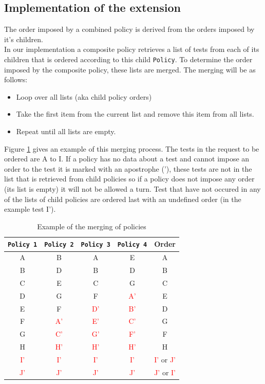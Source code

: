 \documentclass[i3]{oss}
\newcommand{\class}[1]{\texttt{#1}}
\newcommand{\col}[1]{\textcolor{red}{#1}}
\begin{document}
\subsection{Implementation of the extension}
\label{ss:implemenext}

The order imposed by a combined policy is derived from the orders imposed by it's children.\\

In our implementation a composite policy retrieves a list of tests from each of its children that is ordered according to this child \class{Policy}.
To determine the order imposed by the composite policy, these lists are merged.
The merging will be as follows: 
\begin{itemize}
\item Loop over all lists (aka child policy orders)
\item Take the first item from the current list and remove this item from all lists.
\item Repeat until all lists are empty.
\end{itemize}

Figure \ref{fig:orderex} gives an example of this merging process. The tests in the request to be ordered are A to I. If a policy has no data about a test and cannot impose an order to the test it is marked with an apostrophe ('), these tests are not in the list that is retrieved from child policies so if a policy does not impose any order (its list is empty) it will not be allowed a turn.
Test that have not occured in any of the lists of child policies are ordered last with an undefined order (in the example test I').

\begin{table}[h!]
\begin{center}
    \begin{tabular}{ c  c  c  c | c}
     \class{Policy 1} & \class{Policy 2} & \class{Policy 3} & \class{Policy 4} & Order  \\ \hline
     A &        B &        A &        E &        A \\
     B &        D &        B &        D &        B \\
     C &        E &        C &        G &        C\\
     D &        G &        F &   \col{A'} &      E \\
     E &        F &   \col{D'} & \col{B'} &      D \\
     F &   \col{A'} & \col{E'} & \col{C'} &      G \\
     G &   \col{C'} & \col{G'} & \col{F'} &      F \\
     H &   \col{H'} & \col{H'} & \col{H'} &      H \\
\col{I'} & \col{I'} & \col{I'} & \col{I'} & \col{I'} or \col{J'} \\
\col{J'} & \col{J'} & \col{J'} & \col{J'} & \col{J'} or \col{I'} \\
    \end{tabular}
    \caption{Example of the merging of policies }
    \label{fig:orderex}
    \end{center}
\end{table}
\end{document}
